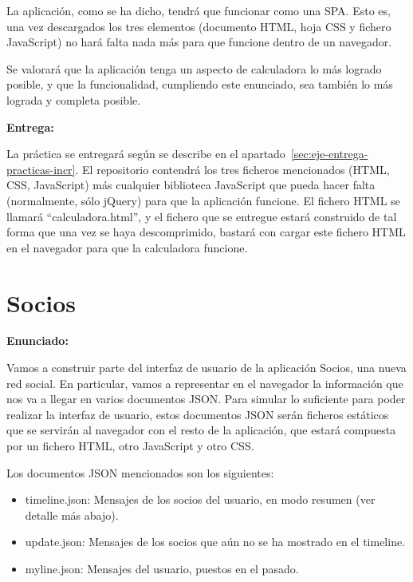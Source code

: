 La aplicación, como se ha dicho, tendrá que funcionar como una SPA. Esto es, una vez descargados los tres elementos (documento HTML, hoja CSS y fichero JavaScript) no hará falta nada más para que funcione dentro de un navegador.

Se valorará que la aplicación tenga un aspecto de calculadora lo más logrado posible, y que la funcionalidad, cumpliendo este enunciado, sea también lo más lograda y completa posible.

\textbf{Entrega:}

La práctica se entregará según se describe en el apartado~\ref{sec:eje-entrega-practicas-incr}. El repositorio contendrá los tres ficheros mencionados (HTML, CSS, JavaScript) más cualquier biblioteca JavaScript que pueda hacer falta (normalmente, sólo jQuery) para que la aplicación funcione. El fichero HTML se llamará ``calculadora.html'', y el fichero que se entregue estará construido de tal forma que una vez se haya descomprimido, bastará con cargar este fichero HTML en el navegador para que la calculadora funcione.

\section{Socios}
\label{sec:voluntaria-socios}

\textbf{Enunciado:}

Vamos a construir parte del interfaz de usuario de la aplicación Socios, una nueva red social. En particular, vamos a representar en el navegador la información que nos va a llegar en varios documentos JSON. Para simular lo suficiente para poder realizar la interfaz de usuario, estos documentos JSON serán ficheros estáticos que se servirán al navegador con el resto de la aplicación, que estará compuesta por un fichero HTML, otro JavaScript y otro CSS.

Los documentos JSON mencionados son los siguientes:

\begin{itemize}
\item timeline.json: Mensajes de los socios del usuario, en modo resumen (ver detalle más abajo).
\item update.json: Mensajes de los socios que aún no se ha mostrado en el timeline.
\item myline.json: Mensajes del usuario, puestos en el pasado.
\end{itemize}

